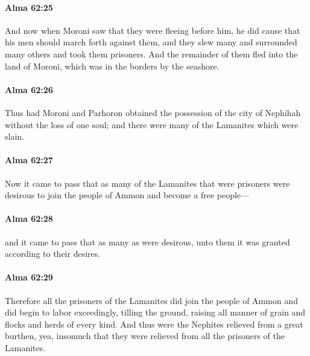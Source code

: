 		\paragraph{Alma 62:25} %
			\label{ALMA-62-25}

			And now when Moroni saw that they were fleeing before him,
			he did cause that his men should march forth against them,
			and they slew many and surrounded many others and took them prisoners.
			And the remainder of them fled into the land of Moroni,
			which was in the borders by the seashore.

		\paragraph{Alma 62:26} %
			\label{ALMA-62-26}

			Thus had Moroni and Parhoron obtained the possession of the city of Nephihah
			without the loss of one soul;
			and there were many of the Lamanites which were slain.

		\paragraph{Alma 62:27} %
			\label{ALMA-62-27}

			Now it came to pass that as many of the Lamanites that were prisoners
			were desirous to join the people of Ammon and become a free people---

		\paragraph{Alma 62:28} %
			\label{ALMA-62-28}

			and it came to pass that as many as were desirous,
			unto them it was granted according to their desires.

		\paragraph{Alma 62:29} %
			\label{ALMA-62-29}

			Therefore all the prisoners of the Lamanites
			did join the people of Ammon and did begin to labor exceedingly,
			tilling the ground, raising all manner of grain and flocks and herds of every kind.
			And thus were the Nephites relieved from a great burthen,
			yea, insomuch that they were relieved from all the prisoners of the Lamanites.

